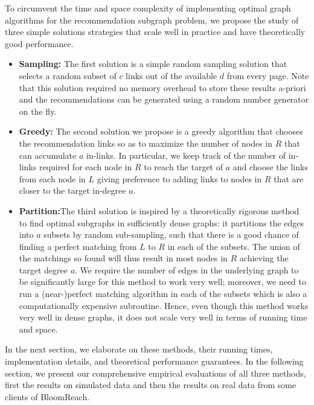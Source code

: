 To circumvent the time and space complexity of implementing optimal graph algorithms for the recommendation subgraph problem, we propose the study of three simple solutions strategies that scale well in practice and have theoretically good performance. 
\begin{itemize}
\item {\bf Sampling:} The first solution is a simple random sampling solution that selects a random subset of $c$ links out of the available $d$ from every page. Note that this solution required no memory overhead to store these results a-priori and the recommendations can be generated using a random number generator on the fly.
\item {\bf Greedy:} The second solution we propose is a greedy algorithm that chooses the recommendation links so as to maximize the number of nodes in $R$ that can accumulate $a$ in-links. In particular, we keep track of the number of in-links required for each node in $R$ to reach the target of $a$ and choose the links from each node in $L$ giving preference to adding links to nodes in $R$ that are closer to the target in-degree $a$.
\item {\bf Partition:}The third solution is inspired by a theoretically rigorous method to find optimal subgraphs in sufficiently dense graphs: it partitions the edges into $a$ subsets by random sub-sampling, such that there is a good chance of finding a perfect matching from $L$ to $R$ in each of the subsets. The union of the matchings so found will thus result in most nodes in $R$ achieving the target degree $a$. We require the number of edges in the underlying graph to be significantly large for this method to work very well; moreover, we need to run a (near-)perfect matching algorithm in each of the subsets which is also a computationally expensive subroutine. Hence, even though this method works very well in dense graphs, it does not scale very well in terms of running time and space.
\end{itemize}

In the next section, we elaborate on these methods, their running times, implementation details, and theoretical performance guarantees. In the following section, we present our comprehensive empirical evaluations of all three methods, first the results on simulated data and then the results on real data from some clients of BloomReach.
 